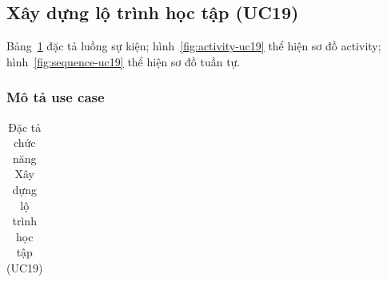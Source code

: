 \subsection{Xây dựng lộ trình học tập (UC19)}
Bảng~\ref{tab:uc19_spec} đặc tả luồng sự kiện; hình~\ref{fig:activity-uc19} thể hiện sơ đồ activity; hình~\ref{fig:sequence-uc19} thể hiện sơ đồ tuần tự.
\subsubsection{Mô tả use case}
\renewcommand{\arraystretch}{1.3}
\setlength{\tbu}{\dimexpr(\linewidth - 4\tabcolsep - 3\arrayrulewidth)/2\relax}
\begin{longtable}{|p{\tbu}|p{\tbu}|}
    \caption{Đặc tả chức năng Xây dựng lộ trình học tập (UC19)} \label{tab:uc19_spec} \\
    

\end{longtable}
